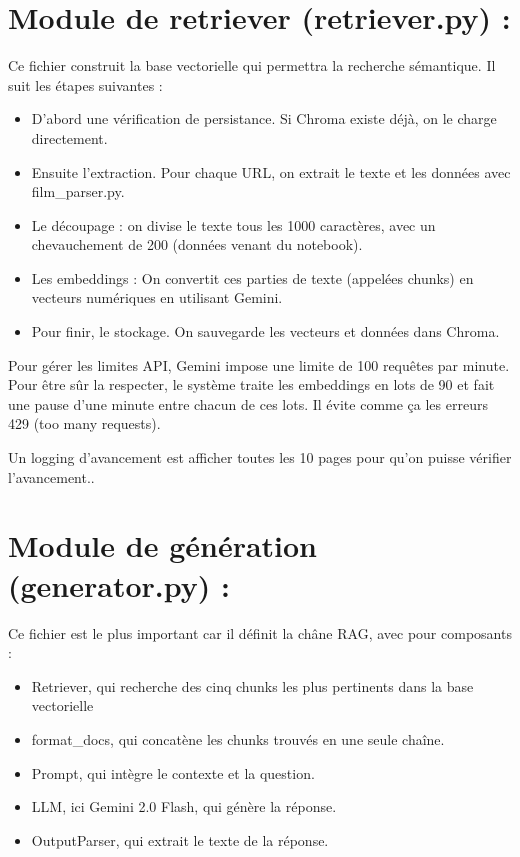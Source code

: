 \documentclass[11pt]{report}
\begin{document}
    \section{Module de retriever (retriever.py) :}
 
    Ce fichier construit la base vectorielle qui permettra la recherche sémantique. Il suit les étapes
    suivantes :
 
    \begin{itemize}
        \item D'abord une vérification de persistance. Si Chroma existe déjà, on le charge directement.
        \item Ensuite l'extraction. Pour chaque URL, on extrait le texte et les données avec
        film\_parser.py.
        \item Le découpage : on divise le texte tous les 1000 caractères, avec un chevauchement de 200
        (données venant du notebook).
        \item Les embeddings : On convertit ces parties de texte (appelées chunks) en vecteurs
        numériques en utilisant Gemini.
        \item Pour finir, le stockage. On sauvegarde les vecteurs et données dans Chroma.
    \end{itemize}
 
    Pour gérer les limites API, Gemini impose une limite de 100 requêtes par minute. Pour être sûr la
    respecter, le système traite les embeddings en lots de 90 et fait une pause d'une minute entre chacun
    de ces lots. Il évite comme ça les erreurs 429 (too many requests).
 
    Un logging d'avancement est afficher toutes les 10 pages pour qu'on puisse vérifier l'avancement..
 
    \section{Module de génération (generator.py) :}
 
    Ce fichier est le plus important car il définit la châne RAG, avec pour composants :
 
    \begin{itemize}
        \item Retriever, qui recherche des cinq chunks les plus pertinents dans la base vectorielle
        \item format\_docs, qui concatène les chunks trouvés en une seule chaîne.
        \item Prompt, qui intègre le contexte et la question.
        \item LLM, ici Gemini 2.0 Flash, qui génère la réponse.
        \item OutputParser, qui extrait le texte de la réponse.
    \end{itemize}
 
\end{document}
